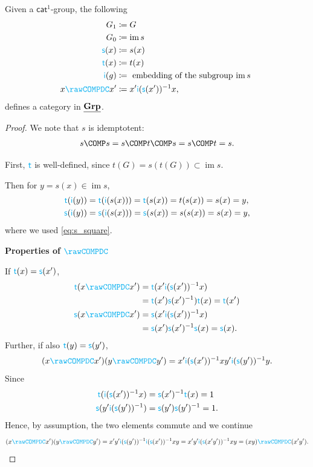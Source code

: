 \documentclass[noamsfonts, reqno]{amsart}
\newcommand\sDC{\mathcolor{cyan}{\mathsf{s}}}
\newcommand\tDC{\mathcolor{cyan}{\mathsf{t}}}
\newcommand\iDC{\mathcolor{cyan}{\mathsf{i}}}
\newcommand{\COMPDC}{\mathcolor{cyan}{\rawCOMPDC}}
\newcommand\im{\operatorname{im}}
\begin{document}
\begin{theorem}

	Given a $\mathsf{cat}^1$-group,
	the following
	\begin{align*}
		G_1       &\coloneqq G \\
		G_0       &\coloneqq \im s \\
		\sDC( x ) &\coloneqq s(x) \\
		\tDC( x ) &\coloneqq t(x) \\
		\iDC( g ) &\coloneqq \text{ embedding of the subgroup $\im s$ } \\
		x \COMPDC x' &\coloneqq x' \iDC(\sDC(x'))^{-1} x,
	\end{align*}
	defines a category in $\underline{\mathbf{Grp}}$.

\end{theorem}
\begin{proof}
	We note that $s$ is idemptotent:
	\begin{align}
		s \COMP s
		=
		s \COMP t \COMP s
		=
		s \COMP t
		=
		s.
		\label{eq:s_square}
	\end{align}

	\bigskip

	First, $\tDC$ is well-defined, 
	since $t(G) = s(t(G)) \subset \im s$.

	Then for $y = s(x) \in \im s$,
	\begin{align*}
		\tDC(\iDC(y))
		&= 
		\tDC(\iDC(s(x)))
		=
		\tDC(s(x))
		=
		t(s(x)) = s(x) = y, \\
		\sDC(\iDC(y))
		&=
		\sDC(\iDC(s(x)))
		=
		\sDC(s(x))
		=
		s(s(x))
		=
		s(x) = y,
	\end{align*}
	where we used \eqref{eq:s_square}.

	\textbf{Properties of $\COMPDC$}

	If $\tDC(x) = \sDC(x')$,
	\begin{align*}
		\tDC( x \COMPDC x' )
		&=
		\tDC( x' \iDC(\sDC(x'))^{-1} x ) \\
		&=
		\tDC( x' ) \sDC(x')^{-1} ) \tDC( x )
		=
		\tDC( x' ) \\
		\sDC( x \COMPDC x' )
		&=
		\sDC( x' \iDC(\sDC(x'))^{-1} x ) \\
		&=
		\sDC( x' ) \sDC(x')^{-1} \sDC( x )
		=
		\sDC(x).
	\end{align*}
	Further,
	if also $\tDC(y) = \sDC(y')$,
	\begin{align*}
		(x \COMPDC x')  (y \COMPDC y')
		=
		x' \iDC(\sDC(x'))^{-1} x y' \iDC(\sDC(y'))^{-1} y.
	\end{align*}
	Since
	\begin{align*}
		\tDC( \iDC(\sDC(x'))^{-1} x )
		&=
		\sDC(x')^{-1} \tDC(x)
		=
		1 \\
		\sDC( y' \iDC(\sDC(y'))^{-1} )
		&=
		\sDC(y') \sDC(y')^{-1} = 1.
	\end{align*}
	Hence, by assumption, the two elements commute and we continue
	\begin{align*}
		(x \COMPDC x')  (y \COMPDC y')
		=
		x' y' \iDC(\sDC(y'))^{-1} \iDC(\sDC(x'))^{-1} x y
		=
		x' y' \iDC(\sDC(x'y'))^{-1} x y
		=
		(x y) \COMPDC (x' y').
	\end{align*}
	
\end{proof}
\end{document}
